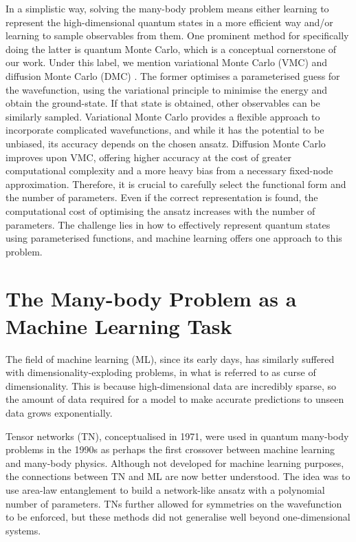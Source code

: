 In a simplistic way, solving the many-body problem means either learning to represent the high-dimensional quantum states in a more efficient way and/or learning to sample observables from them. One prominent method for specifically doing the latter is quantum Monte Carlo, which is a conceptual cornerstone of our work. Under this label, we mention variational Monte Carlo (VMC) and diffusion Monte Carlo (DMC) \cite{sorellabook}. The former optimises a parameterised guess for the wavefunction, using the variational principle to minimise the energy and obtain the ground-state. If that state is obtained, other observables can be similarly sampled. Variational Monte Carlo provides a flexible approach to incorporate complicated wavefunctions, and while it has the potential to be unbiased, its accuracy depends on the chosen ansatz. Diffusion Monte Carlo improves upon VMC, offering higher accuracy at the cost of greater computational complexity and a more heavy bias from a necessary fixed-node approximation. Therefore, it is crucial to carefully select the functional form and the number of parameters. Even if the correct representation is found, the computational cost of optimising the ansatz increases with the number of parameters. The challenge lies in how to effectively represent quantum states using parameterised functions, and machine learning offers one approach to this problem.

\section{The Many-body Problem as a Machine Learning Task}

The field of machine learning (ML), since its early days, has similarly suffered with dimensionality-exploding problems, in what is referred to as curse of dimensionality. This is because high-dimensional data are incredibly sparse, so the amount of data required for a model to make accurate predictions to unseen data grows exponentially. 

Tensor networks (TN), conceptualised in 1971, were used in quantum many-body problems in the 1990s \cite{white1992density} as perhaps the first crossover between machine learning and many-body physics. Although not developed for machine learning purposes, the connections between TN and ML are now better understood. The idea was to use area-law entanglement to build a network-like ansatz with a polynomial number of parameters. TNs further allowed for symmetries on the wavefunction to be enforced, but these methods did not generalise well beyond one-dimensional systems.

